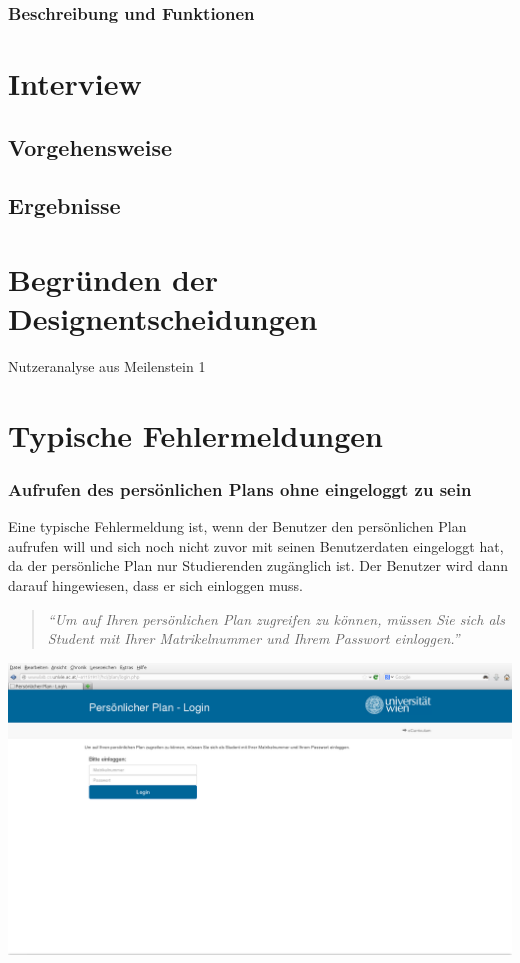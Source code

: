 \documentclass[a4paper,10pt]{scrartcl}
\begin{document}
\subsubsection*{Beschreibung und Funktionen}

\section*{Interview}

\subsection*{Vorgehensweise}

\subsection*{Ergebnisse}

\section*{Begründen der Designentscheidungen}
Nutzeranalyse aus Meilenstein 1

\section*{Typische Fehlermeldungen}

\subsubsection*{Aufrufen des persönlichen Plans ohne eingeloggt zu sein}

Eine typische Fehlermeldung ist, wenn der Benutzer den persönlichen Plan aufrufen will und sich noch nicht zuvor mit seinen Benutzerdaten eingeloggt hat,
da der persönliche Plan nur Studierenden zugänglich ist. Der Benutzer wird dann darauf hingewiesen, dass er sich einloggen muss.

\begin{quote}
 \textit{``Um auf Ihren persönlichen Plan zugreifen zu können, müssen Sie sich als Student mit Ihrer Matrikelnummer und Ihrem Passwort einloggen.''}
\end{quote} 

\begin{center}
 \includegraphics[scale=0.4]{./fehlermeldung1.png}
\end{center}
\end{document}
